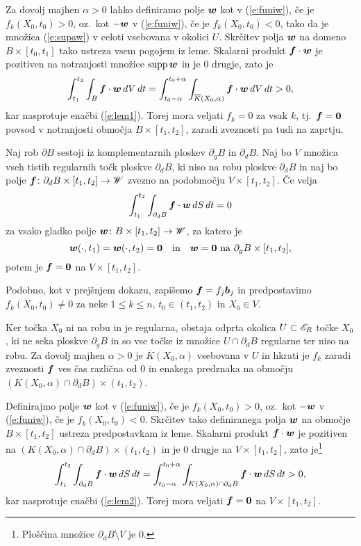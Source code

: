 	Za dovolj majhen $\alpha>0$ lahko definiramo polje
	$\boldsymbol w$ kot v (\ref{e:funiw}), če je $f_{k}(X_0,t_0) > 0$, oz.~kot $-\boldsymbol w$ v (\ref{e:funiw}),
	če je $f_{k}(X_0,t_0) < 0$, tako da je množica (\ref{e:supaw}) v celoti vsebovana v okolici $U$.
	Skrčitev polja $\boldsymbol w$ na domeno $B\times[t_0,t_1]$ tako ustreza vsem pogojem iz leme.
	Skalarni produkt $\boldsymbol f\cdot\boldsymbol w$ je pozitiven na notranjosti množice
	$\mathrm{supp}\,\boldsymbol w$ in je 0 drugje, zato je
	\[
		\int_{t_1}^{t_2}\int_B \boldsymbol f\cdot \boldsymbol w\,dV\,dt=
		\int_{t_0-\alpha}^{t_0+\alpha}\int_{\overline{K}(X_0,\alpha)} \boldsymbol f\cdot \boldsymbol w\,dV\,dt> 0,
	\]
	kar nasprotuje enačbi (\ref{e:lem1}). Torej mora veljati $f_k=0$ za vsak $k$,
	tj.~$\boldsymbol f=\boldsymbol 0$ povsod v notranjosti območja $B\times [t_1,t_2]$,
	zaradi zveznosti pa tudi na zaprtju.
\endproof

\begin{lema}\label{l:2}
	Naj rob $\partial B$ sestoji iz komplementarnih ploskev $\partial_g B$ in
	$\partial_d B$. Naj bo $V$ množica vseh tistih regularnih točk ploskve $\partial_d B$,
	ki niso na robu ploskve $\partial_d B$ in naj bo 
	polje $\boldsymbol f\colon \partial_d B\times[t_1,t_2]\to \mathscr W$ zvezno na podobmočju $V\times[t_1,t_2]$.
	Če velja
	\begin{equation}\label{e:lem2}
		\int_{t_1}^{t_2}\int_{\partial_d B} \boldsymbol f\cdot \boldsymbol w\,dS\,dt = 0
	\end{equation}
	za vsako gladko polje $\boldsymbol w\colon B\times[t_1,t_2]\to\mathscr W$, za katero je
	\[
		\boldsymbol w(\cdot,t_1)=\boldsymbol w(\cdot,t_2)=\boldsymbol 0\quad\textrm{in}
		\quad\boldsymbol w=\boldsymbol 0\ \textrm{na}\ \partial_g B\times[t_1,t_2],
	\]
	potem je $\boldsymbol f=\boldsymbol 0$ na $V\times [t_1,t_2]$.
\end{lema}

\proof
	Podobno, kot v prejšnjem dokazu, zapišemo $\boldsymbol f=f_j\boldsymbol b_j$ in predpostavimo
	$f_{k}(X_0,t_0)\neq 0$ za neke $1\leq k\leq n$, $t_0\in (t_1,t_2)$ in $X_0\in V$.
	
	Ker točka $X_0$ ni na robu in je regularna, obstaja odprta okolica $U\subset\mathscr E_R$ točke
	$X_0$, ki ne seka ploskve $\partial_g B$ in so vse točke iz množice $U\cap\partial_d B$
	regularne ter niso na robu.
	Za dovolj majhen $\alpha>0$ je $\overline{K}(X_0,\alpha)$ vsebovana v $U$ in
	hkrati je $f_k$ zaradi zveznosti $\boldsymbol f$ ves čas različna od 0 in enakega predznaka
	na območju $(K(X_0,\alpha)\cap\partial_dB)\times(t_1,t_2)$.
	
	Definirajmo polje $\boldsymbol w$ kot v
	(\ref{e:funiw}), če je $f_{k}(X_0,t_0) > 0$, oz.~kot $-\boldsymbol w$ v (\ref{e:funiw}),
	če je $f_{k}(X_0,t_0) < 0$. Skrčitev tako definiranega polja $\boldsymbol w$ na območje
	$B\times[t_1,t_2]$ ustreza predpostavkam iz leme.
	Skalarni produkt $\boldsymbol f\cdot\boldsymbol w$ je pozitiven na
	$(K(X_0,\alpha)\cap\partial_dB)\times(t_1,t_2)$ in je 0 drugje na $V\times[t_1,t_2]$,
	zato je\footnote{Ploščina množice $\partial_dB\setminus V$ je 0.}
	\[
		\int_{t_1}^{t_2}\int_{\partial_d B} \boldsymbol f\cdot \boldsymbol w\,dS\,dt=
		\int_{t_0-\alpha}^{t_0+\alpha}\int_{K(X_0,\alpha)\cap\partial_dB} \boldsymbol f\cdot \boldsymbol w\,dS\,dt> 0,
	\]
	kar nasprotuje enačbi (\ref{e:lem2}). Torej mora veljati $\boldsymbol f=\boldsymbol 0$ na
	$V\times [t_1,t_2]$.
\endproof

